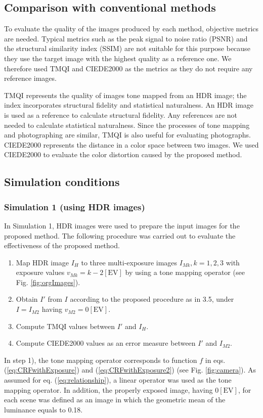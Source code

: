 \documentclass[paper]{ieice}
\begin{document}
\subsection{Comparison with conventional methods}
  To evaluate the quality of the images produced by each method,
  objective metrics are needed.
  Typical metrics such as the peak signal to noise ratio (PSNR)
  and the structural similarity index (SSIM) are not suitable for this purpose
  because they use the target image with the highest quality as a reference one.
  We therefore used TMQI\cite{yeganeh2013objective} and
  CIEDE2000\cite{sharma2005ciede2000} as the metrics as they do not require
  any reference images.

  TMQI represents the quality of images tone mapped from an HDR image;
  the index incorporates structural fidelity and statistical naturalness.
  An HDR image is used as a reference to calculate structural fidelity.
  Any references are not needed to calculate statistical naturalness.
  Since the processes of tone mapping and photographing are similar,
  TMQI is also useful for evaluating photographs.
  CIEDE2000 represents
  the distance in a color space between two images.
  We used CIEDE2000 to evaluate the color distortion caused by the proposed method.
%
\subsection{Simulation conditions}
%
  \subsubsection{Simulation 1 (using HDR images)}
  In Simulation 1, HDR images were used to prepare the input images for the proposed method.
  The following procedure was carried out to evaluate the effectiveness of the proposed method.
  \begin{enumerate}[nosep]
    \item Map HDR image $I_H$ to three multi-exposure images $I_{Mk}, k = 1,2,3$
      with exposure values $v_{Mk} = k-2\mathrm{[EV]}$
      by using a tone mapping operator (see Fig. \ref{fig:orgImages}).
    \item Obtain $I'$ from $I$ according to the proposed procedure as in 3.5,
      under $I=I_{M2}$ having $v_{M2} = 0\mathrm{[EV]}$.
    \item Compute TMQI values between $I'$ and $I_H$.
    \item Compute CIEDE2000 values as an error measure between $I'$ and $I_{M2}$.
  \end{enumerate}
  In step 1), the tone mapping operator corresponds to function $f$
  in eqs. (\ref{eq:CRFwithExposure})
  and (\ref{eq:CRFwithExposure2}) (see Fig. \ref{fig:camera}).
  As assumed for eq. (\ref{eq:relationship}),
  a linear operator was used as the tone mapping operator.
  In addition, the properly exposed image, having $0\mathrm{[EV]}$,
  for each scene was defined as an image in which the geometric mean of the luminance
  equals to 0.18.
\end{document}
